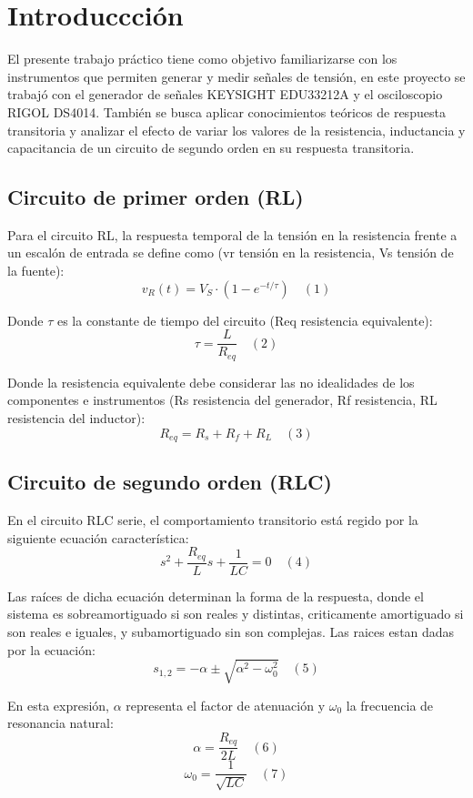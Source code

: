 \section{Introduccción}
El presente trabajo práctico tiene como objetivo familiarizarse con los instrumentos que permiten generar y medir señales de tensión, en este proyecto se trabajó con el generador de señales KEYSIGHT EDU33212A y el osciloscopio RIGOL DS4014. También se busca aplicar conocimientos teóricos de respuesta transitoria y analizar el efecto de variar los valores de la resistencia, inductancia y capacitancia de un circuito de segundo orden en su respuesta transitoria.

\subsection*{Circuito de primer orden (RL)}
Para el circuito RL, la respuesta temporal de la tensión en la resistencia frente a un escalón de entrada se define como (vr tensión en la resistencia, Vs tensión de la fuente):
\[ v_R(t) = V_S \cdot (1 - e^{-t/\tau}) \quad (1)\]

Donde $\tau$ es la constante de tiempo del circuito (Req resistencia equivalente):
\[ \tau = \frac{L}{R_{eq}} \quad (2)\]

Donde la resistencia equivalente debe considerar las no idealidades de los componentes e instrumentos (Rs resistencia del generador, Rf resistencia, RL resistencia del inductor):
\[ R_{eq} = R_s + R_f + R_L \quad (3)\]

\subsection*{Circuito de segundo orden (RLC)}
En el circuito RLC serie, el comportamiento transitorio está regido por la siguiente ecuación característica:
\[ s^2 + \frac{R_{eq}}{L}s + \frac{1}{LC} = 0 \quad (4)\]

Las raíces de dicha ecuación determinan la forma de la respuesta, donde el sistema es sobreamortiguado si son reales y distintas, criticamente amortiguado si son reales e iguales, y subamortiguado sin son complejas. Las raices estan dadas por la ecuación:
\[ s_{1,2} = -\alpha \pm \sqrt{\alpha^2 - \omega_0^2} \quad (5)\]

En esta expresión, $\alpha$ representa el factor de atenuación y $\omega_0$ la frecuencia de resonancia natural:
\[ \alpha = \frac{R_{eq}}{2L} \quad (6)\]
\[ \omega_0 = \frac{1}{\sqrt{LC}} \quad (7)\]

